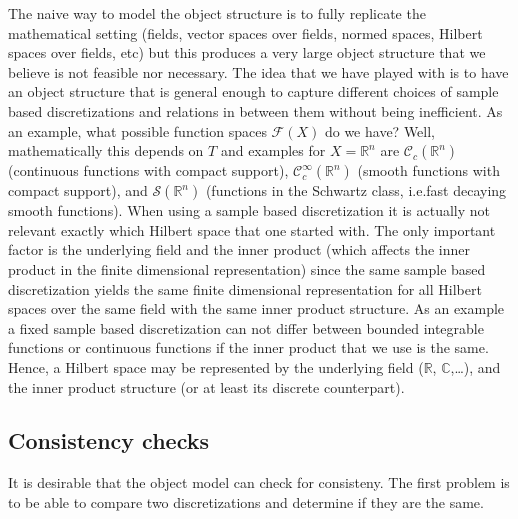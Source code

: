 \documentclass[a4paper]{article}
\newcommand{\R}{\mathbb{R}}
\newcommand{\C}{\mathbb{C}}
\newcommand{\Cc}{\mathcal{C}}
\newcommand{\cF}{\mathcal{F}}
\begin{document}
The naive way to model the object structure is to fully replicate the 
mathematical setting (fields, vector spaces over fields, normed spaces, Hilbert 
spaces over fields, etc) but this produces a very large object structure 
that we believe is not feasible nor necessary. The idea that we have 
played with
is to have an object structure that is general enough to capture different 
choices of sample based discretizations and relations in between them 
without being inefficient. 
As an example, what possible function spaces $\cF(X)$ do we have? Well, 
mathematically this depends on $T$ and examples for $X=\R^n$ 
are $\Cc_{c}(\R^n)$ (continuous functions with compact 
support), $\Cc^\infty_{c}(\R^n)$ (smooth functions with compact 
support), and 
$\mathcal{S}(\R^n)$ (functions in the Schwartz class, i.e.\@ fast 
decaying smooth functions). When using 
a sample based discretization it is actually not relevant exactly which 
Hilbert space that one started with. The only important factor is the 
underlying field and the inner product (which affects the inner 
product in the finite dimensional representation) since the same 
sample based discretization yields the same finite dimensional representation for 
all Hilbert spaces over the same field with the same inner product structure.
As an example a fixed sample based discretization can not differ between bounded 
integrable functions or 
continuous functions if the inner product that we use is the same. 
Hence, a Hilbert space may be represented by the underlying field 
($\R$, $\C$,\ldots), and the inner product structure (or at least its 
discrete counterpart).

\subsection{Consistency checks}
It is desirable that the object model can check for consisteny. The 
first problem is to be able to compare two discretizations and 
determine if they are the same.
\end{document}
